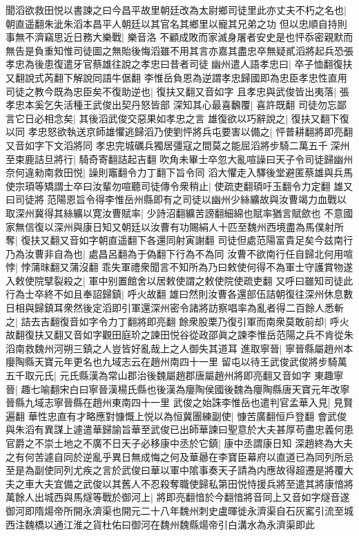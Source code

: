 聞滔欲救田悦以書諫之曰今昌平故里朝廷改為太尉鄉司徒里此亦丈夫不朽之名也|{
	朝直遥翻朱泚朱滔本昌平人朝廷以其官名其鄉里以寵其兄弟之功}
但以忠順自持則事無不濟竊思近日務大樂戰|{
	樂音洛}
不顧成敗而家滅身屠者安史是也怦忝密親默而無告是負重知惟司徒圖之無貽後悔滔雖不用其言亦嘉其盡忠卒無疑貳滔將起兵恐張孝忠為後患復遣牙官蔡雄往說之孝忠曰昔者司徒幽州遣人語孝忠曰|{
	卒子恤翻復扶又翻說式芮翻下解說同語牛倨翻}
李惟岳負恩為逆謂孝忠歸國即為忠臣孝忠性直用司徒之教今既為忠臣矣不復助逆也|{
	復扶又翻又音如字}
且孝忠與武俊皆出夷落|{
	張孝忠本奚乞失活種王武俊出契丹怒皆部}
深知其心最喜飜覆|{
	喜許既翻}
司徒勿忘鄙言它日必相念矣|{
	其後滔武俊交惡果如孝忠之言}
雄復欲以巧辭說之|{
	復扶又翻下復以同}
孝忠怒欲執送京師雄懼逃歸滔乃使劉怦將兵屯要害以備之|{
	怦普耕翻將即亮翻又音如字下文滔將同}
孝忠完城礪兵獨居彊寇之間莫之能屈滔將步騎二萬五千深州至束鹿詰旦將行|{
	騎奇寄翻詰起吉翻}
吹角未畢士卒忽大亂喧譟曰天子令司徒歸幽州奈何違勑南救田悦|{
	譟則竈翻令力丁翻下旨令同}
滔大懼走入驛後堂避匿蔡雄與兵馬使宗頊等矯謂士卒曰汝輩勿喧聽司徒傳令衆稍止|{
	使疏吏翻頊吁玉翻令力定翻}
雄又曰司徒將范陽恩旨令得李惟岳州縣即有之司徒以幽州少絲纊故與汝曹竭力血戰以取深州冀得其絲纊以寛汝曹賦率|{
	少詩沼翻纊苦謗翻細綿也賦率猶言賦歛也}
不意國家無信復以深州與康日知又朝廷以汝曹有功賜絹人十匹至魏州西境盡為馬僕射所奪|{
	復扶又翻又音如字朝直遥翻下各還同射寅謝翻}
司徒但處范陽富貴足矣今兹南行乃為汝曹非自為也|{
	處昌呂翻為于偽翻下行為不為同}
汝曹不欲南行任自歸北何用喧悖|{
	悖蒲昩翻又蒲沒翻}
乖失軍禮衆聞言不知所為乃曰敕使何得不為軍士守護賞物遂入敕使院擘裂殺之|{
	軍中别置館舍以居敕使謂之敕使院使疏吏翻}
又呼曰雖知司徒此行為士卒終不如且奉詔歸鎮|{
	呼火故翻}
雄曰然則汝曹各還部伍詰朝復往深州休息數日相與歸鎮耳衆然後定滔即引軍還深州密令諸將訪察唱率為亂者得二百餘人悉斬之|{
	詰去吉翻復音如字令力丁翻將即亮翻}
餘衆股栗乃復引軍而南衆莫敢前却|{
	呼火故翻復扶又翻又音如字觀田庭玠之諫田悦谷從政邵眞之諫李惟岳范陽之兵不肯從朱滔南救魏州河朔三鎮之人豈皆好亂哉上之人御失其道耳}
進取寧晉|{
	寧晉縣屬趙州本癭陶縣天寶元年更名也九域志云在趙州南四十一里}
留屯以待王武俊武俊將步騎萬五千取元氏|{
	元氏縣漢為常山郡治後魏屬趙郡唐屬趙州將即亮翻又音如字}
東趣寧晉|{
	趣七喻翻宋白曰寧晉漢楊氏縣也後漢為癭陶侯國後魏為癭陶縣唐天寶元年改寧晉縣九域志寧晉縣在趙州東南四十一里}
武俊之始誅李惟岳也遣判官孟華入見|{
	見賢遍翻}
華性忠直有才略應對慷慨上悦以為恒冀團練副使|{
	慷苦廣翻恒戶登翻}
會武俊與朱滔有異謀上遽遣華歸諭旨華至武俊已出師華諫曰聖意於大夫甚厚苟盡忠義何患官爵之不崇土地之不廣不日天子必移康中丞於它鎮|{
	康中丞謂康日知}
深趙終為大夫之有何苦遽自同於逆亂乎異日無成悔之何及華曏在李寶臣幕府以直道已為同列所忌至是為副使同列尤疾之言於武俊曰華以軍中隂事奏天子請為内應故得超遷是將覆大夫之車大夫宜備之武俊以其舊人不忍殺奪職使歸私第田悦恃援兵將至遣其將康愔將萬餘人出城西與馬燧等戰於御河上|{
	將即亮翻愔於今翻愔將音同上又音如字燧音遂御河即隋煬帝所開永濟渠也開元二十八年魏州刺史盧暉徙永濟渠自石灰窰引流至城西注魏橋以通江淮之貨杜佑曰御河在魏州魏縣煬帝引白溝水為永濟渠即此}
